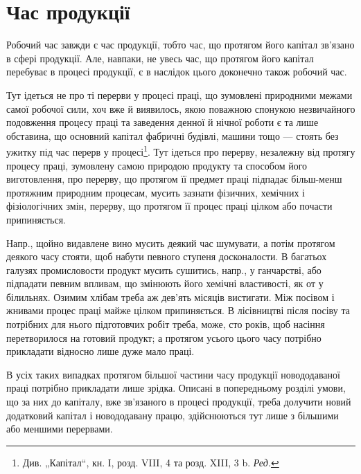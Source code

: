 
\section{Час продукції}

Робочий час завжди є час продукції, тобто час, що протягом його
капітал зв’язано в сфері продукції. Але, навпаки, не увесь час, що протягом
його капітал перебуває в процесі продукції, є в наслідок цього
доконечно також робочий час.

Тут ідеться не про ті перерви у процесі праці, що зумовлені природними
межами самої робочої сили, хоч вже й виявилось, якою поважною
спонукою незвичайного подовження процесу праці та заведення
денної й нічної роботи є та лише обставина, що основний капітал
фабричні будівлі, машини тощо — стоять без ужитку під час перерв у процесі\footnote*{
Див. „Капітал“, кн. І, розд. VIII, 4 та розд. XIII, 3 b. \emph{Ред.}
}.
Тут ідеться про перерву, незалежну від протягу процесу праці,
зумовлену самою природою продукту та способом його виготовлення,
про перерву, що протягом її предмет праці підпадає більш-менш протяжним
природним процесам, мусить зазнати фізичних, хемічних і фізіологічних
змін, перерву, що протягом її процес праці цілком або почасти
припиняється.

Напр., щойно видавлене вино мусить деякий час шумувати, а потім
протягом деякого часу стояти, щоб набути певного ступеня досконалости.
В багатьох галузях промисловости продукт мусить сушитись, напр., у
ганчарстві, або підпадати певним впливам, що змінюють його хемічні
властивості, як от у білильнях. Озимим хлібам треба аж дев’ять місяців
вистигати. Між посівом і жнивами процес праці майже цілком припиняється.
В лісівництві після посіву та потрібних для нього підготовчих
робіт треба, може, сто років, щоб насіння перетворилося на готовий продукт;
а протягом усього цього часу потрібно прикладати відносно лише
дуже мало праці.

В усіх таких випадках протягом більшої частини часу продукції новододаваної
праці потрібно прикладати лише зрідка. Описані в попередньому
розділі умови, що за них до капіталу, вже зв’язаного в процесі
продукції, треба долучити новий додатковий капітал і новододавану працю,
здійснюються тут лише з більшими або меншими перервами.

